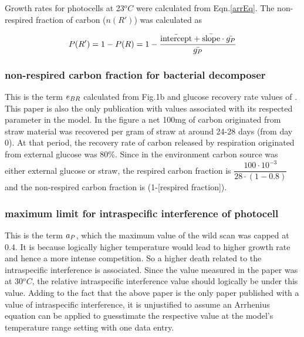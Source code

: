 \documentclass[../thesis.tex]{subfiles} %
\begin{document}
Growth rates for photocells at 23$^oC$ were calculated from Eqn.\ref{arrEq}.  The non-respired fraction of carbon ($n(R')$) was calculated as

\begin{equation}
    P(R') = 1-P(R) = 1-\dfrac{\Bar{\text{intercept}}+\Bar{\text{slope}}\cdot\Bar{g_P}}{\Bar{g_P}}
    \label{ePReqn}
\end{equation}

\subsubsection{non-respired carbon fraction for bacterial decomposer}
This is the term $e_{BR}$ calculated from Fig.1b and glucose recovery rate values of \autocite{cochran1988estimation}.  This paper is also the only publication with values associated with its respected parameter in the model.  In the figure a net 100mg of carbon originated from straw material was recovered per gram of straw at around 24-28 days (from day 0).  At that period, the recovery rate of carbon released by respiration originated from external glucose was 80\%.  Since in the environment carbon source was either external glucose or straw, the respired carbon fraction is $\dfrac{100\cdot10^{-3}}{28\cdot(1-0.8)}$ and the non-respired carbon fraction is (1-[respired fraction]).

\subsubsection{maximum limit for intraspecific interference of photocell}
This is the term $a_P$, which the maximum value of the wild scan was capped at 0.4.\autocite{de2007biofixation}  It is because logically higher temperature would lead to higher growth rate and hence a more intense competition.  So a higher death related to the intraspecific interference is associated.  Since the value measured in the paper was at 30$^oC$, the relative intraspecific interference value should logically be under this value.  Adding to the fact that the above paper is the only paper published with a value of intraspecific interference, it is unjustified to assume an Arrhenius equation can be applied to guesstimate the respective value at the model's temperature range setting with one data entry.
\end{document}

